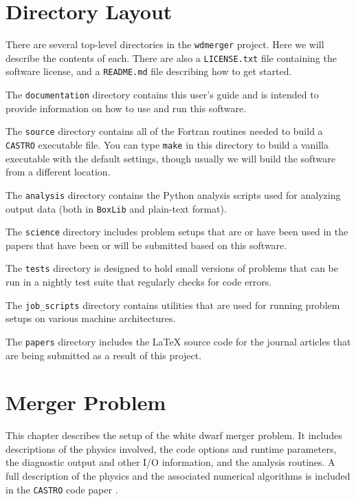 \documentclass[12pt]{book}
\begin{document}
\chapter{Directory Layout}

There are several top-level directories in the \texttt{wdmerger} project. Here we will describe
the contents of each. There are also a \texttt{LICENSE.txt} file containing the software license,
and a \texttt{README.md} file describing how to get started.

The \texttt{documentation} directory contains this user's guide and is intended to provide information
on how to use and run this software.

The \texttt{source} directory contains all of the Fortran routines needed to build a \texttt{CASTRO} 
executable file. You can type \texttt{make} in this directory to build a vanilla executable 
with the default settings, though usually we will build the software from a different location.

The \texttt{analysis} directory contains the Python analysis scripts used for analyzing output
data (both in \texttt{BoxLib} and plain-text format). 

The \texttt{science} directory includes problem setups that are or have been used in the papers
that have been or will be submitted based on this software.

The \texttt{tests} directory is designed to hold small versions of problems that can be run in a
nightly test suite that regularly checks for code errors.

The \texttt{job\_scripts} directory contains utilities that are used for running
problem setups on various machine architectures.

The \texttt{papers} directory includes the LaTeX source code for the journal articles
that are being submitted as a result of this project.



\chapter{Merger Problem}

This chapter describes the setup of the white dwarf merger problem. It includes descriptions of 
the physics involved, the code options and runtime parameters, the diagnostic output 
and other I/O information, and the analysis routines. A full description of the physics 
and the associated numerical algorithms is included in the \texttt{CASTRO} code paper \cite{castro}.
\end{document}
